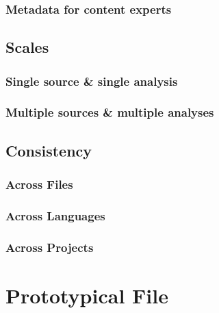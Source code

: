 \documentclass[
]{book}
\begin{document}
\hypertarget{metadata-for-content-experts}{%
\subsection{Metadata for content experts}\label{metadata-for-content-experts}}

\hypertarget{scales}{%
\section{Scales}\label{scales}}

\hypertarget{single-source-single-analysis}{%
\subsection{Single source \& single analysis}\label{single-source-single-analysis}}

\hypertarget{multiple-sources-multiple-analyses}{%
\subsection{Multiple sources \& multiple analyses}\label{multiple-sources-multiple-analyses}}

\hypertarget{architecture-consistency}{%
\section{Consistency}\label{architecture-consistency}}

\hypertarget{consistency-files}{%
\subsection{Across Files}\label{consistency-files}}

\hypertarget{across-languages}{%
\subsection{Across Languages}\label{across-languages}}

\hypertarget{across-projects}{%
\subsection{Across Projects}\label{across-projects}}

\hypertarget{file-prototype}{%
\chapter{Prototypical File}\label{file-prototype}}
\end{document}
